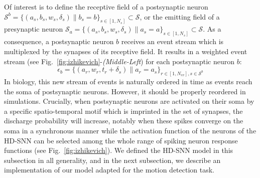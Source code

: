 \documentclass[default]{sn-jnl}%
\theoremstyle{thmstyleone}%
\theoremstyle{thmstyletwo}%
\theoremstyle{thmstylethree}%
\newcommand{\seeFig}[1]{see Fig.~\ref{fig:#1}}%
\newcommand{\presynaddr}{a} %
\newcommand{\postsynaddr}{b} %
\newcommand{\numevent}{N_{ev}} %
\newcommand{\arank}{r} %
\newcommand{\synapse}{\mathcal{S}} %
\newcommand{\synapticweight}{w} %
\newcommand{\synapticdelay}{\delta} %
\newcommand{\ranksyn}{s} %
\newcommand{\Nsyn}{N_{s}} %
\newcommand{\timev}{t} %
\newcommand{\event}{\epsilon} %
\begin{document}
Of interest is to define the receptive field of a postsynaptic neuron $\synapse^\postsynaddr =  \{(\presynaddr_\ranksyn, \postsynaddr_\ranksyn, \synapticweight_\ranksyn, \synapticdelay_\ranksyn) \| \postsynaddr_\ranksyn=\postsynaddr\}_{\ranksyn \in [1,\Nsyn]}  \subset \synapse$, or the emitting field of a presynaptic neuron $\synapse_\presynaddr = \{(\presynaddr_\ranksyn, \postsynaddr_\ranksyn, \synapticweight_\ranksyn, \synapticdelay_\ranksyn) \| \presynaddr_\ranksyn=\presynaddr\}_{\ranksyn \in [1,\Nsyn]} \subset \synapse$. As a consequence, a postsynaptic neuron $\postsynaddr$ receives an event stream which is multiplexed by the synapses of its receptive field. It results in a weighted event stream (\seeFig{izhikevich}-\textit{(Middle-Left}) for each  postsynaptic neuron $\postsynaddr$: 
%
\begin{equation}\label{eq:stream_b}
\event_\postsynaddr = \{(\presynaddr_\arank, \synapticweight_\arank, \timev_\arank+\synapticdelay_\ranksyn) \| \presynaddr_\arank = \presynaddr_\ranksyn \}_{\arank \in [1,\numevent], \ranksyn \in \synapse^\postsynaddr}
\end{equation}
%
In biology, this new stream of events is naturally ordered in time as events reach the soma of postsynaptic neurons. However, it should be properly reordered in simulations. Crucially, when postsynaptic neurons are activated on their soma by a specific spatio-temporal motif which is imprinted in the set of synapses, the discharge probability will increase, notably when these spikes converge on the soma in a synchronous manner while the activation function of the neurons of the HD-SNN can be selected among the whole range of spiking neuron response functions (\seeFig{izhikevich}). We defined the HD-SNN model in this subsection in all generality, and in the next subsection, we describe an implementation of our model adapted for the motion detection task. 
%
\end{document}
